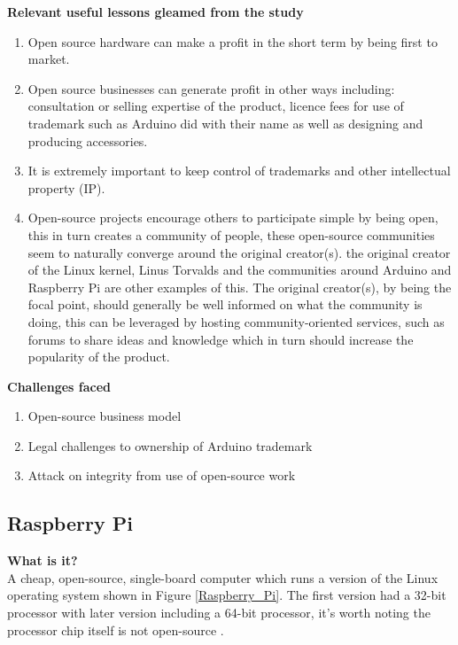 \textbf{Relevant useful lessons gleamed from the study}
\begin{enumerate}
\item Open source hardware can make a profit in the short term by being first to market.
\item Open source businesses can generate profit in other ways including: consultation or selling expertise of the product, licence fees for use of trademark such as Arduino did with their name as well as designing and producing accessories.
\item It is extremely important to keep control of trademarks and other intellectual property (IP).
\item Open-source projects encourage others to participate simple by being open, this in turn creates a community of people, these open-source communities seem to naturally converge around the original creator(s). the original creator of the Linux kernel, Linus Torvalds and the communities around Arduino and Raspberry Pi are other examples of this. The original creator(s), by being the focal point, should generally be well informed on what the community is doing, this can be leveraged by hosting community-oriented services, such as forums to share ideas and knowledge which in turn should increase the popularity of the product. \\
\end{enumerate}

\textbf{Challenges faced}
\begin{enumerate}
\item Open-source business model
\item Legal challenges to ownership of Arduino trademark
\item Attack on integrity from use of open-source work
\end{enumerate}

\subsection{Raspberry Pi}
\textbf{What is it?}\\
A cheap, open-source, single-board computer which runs a version of the Linux operating system shown in Figure \ref{Raspberry_Pi}. The first version had a 32-bit processor with later version including a 64-bit processor, it's worth noting the processor chip itself is not open-source
\cite{RN99}.\\

